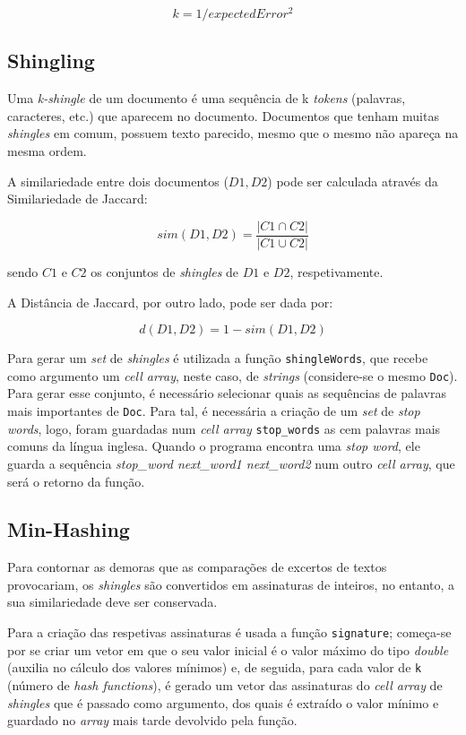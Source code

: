 \documentclass[a4paper,11pt,openright,oneside]{report}
\begin{document}
$$ k = 1 / expectedError^2 $$

\subsection{Shingling}
\label{subsec.shingling}

Uma \textit{k-shingle} de um documento é uma sequência de k \textit{tokens} (palavras, caracteres, etc.) que aparecem no documento. Documentos que tenham muitas \textit{shingles} em comum, possuem texto parecido, mesmo que o mesmo não apareça na mesma ordem.

A similariedade entre dois documentos ($D1, D2$) pode ser calculada através da Similariedade de Jaccard:

$$ sim(D1, D2) = \frac{|C1\cap C2|}{|C1\cup C2|} $$

sendo $C1$ e $C2$ os conjuntos de \textit{shingles} de $D1$ e $D2$, respetivamente.

A Distância de Jaccard, por outro lado, pode ser dada por:

$$ d(D1, D2) = 1 - sim(D1, D2) $$

Para gerar um \textit{set} de \textit{shingles} é utilizada a função \texttt{shingleWords}, que recebe como argumento um \textit{cell array}, neste caso, de \textit{strings} (considere-se o mesmo \texttt{Doc}). Para gerar esse conjunto, é necessário selecionar quais as sequências de palavras mais importantes de \texttt{Doc}. Para tal, é necessária a criação de um \textit{set} de \textit{stop words}, logo, foram guardadas num \textit{cell array} \texttt{stop\_words} as cem palavras mais comuns da língua inglesa. Quando o programa encontra uma \textit{stop word}, ele guarda a sequência \textit{stop\_word next\_word1 next\_word2} num outro \textit{cell array}, que será o retorno da função.

\subsection{Min-Hashing}
\label{subsec.minhash}

Para contornar as demoras que as comparações de excertos de textos provocariam, os \textit{shingles} são convertidos em assinaturas de inteiros, no entanto, a sua similariedade deve ser conservada.

Para a criação das respetivas assinaturas é usada a função \texttt{signature}; começa-se por se criar um vetor em que o seu valor inicial é o valor máximo do tipo \textit{double} (auxilia no cálculo dos valores mínimos) e, de seguida, para cada valor de \texttt{k} (número de \textit{hash functions}), é gerado um vetor das assinaturas do \textit{cell array} de \textit{shingles} que é passado como argumento, dos quais é extraído o valor mínimo e guardado no \textit{array} mais tarde devolvido pela função.
\end{document}
